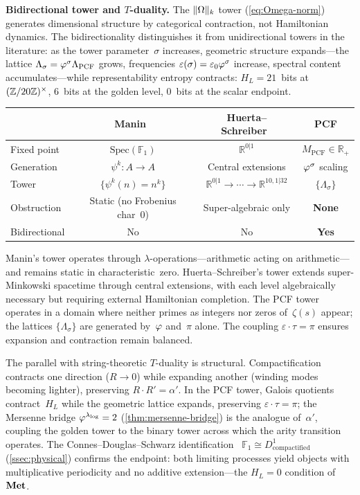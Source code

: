 \smallskip\noindent\textbf{Bidirectional tower and $T$-duality.}
The $\|\Omega\|_k$ tower (\cref{eq:Omega-norm}) generates
dimensional structure by categorical contraction, not Hamiltonian
dynamics.  The bidirectionality distinguishes it from unidirectional
towers in the literature: as the tower parameter~$\sigma$ increases,
geometric structure expands---the lattice
$\Lambda_\sigma = \varphi^\sigma\Lambda_{\mathrm{PCF}}$ grows,
frequencies $\varepsilon(\sigma)=\varepsilon_0\varphi^\sigma$ increase,
spectral content accumulates---while representability entropy contracts:
$H_L = 21$~bits at $(\mathbb{Z}/20\mathbb{Z})^\times$, $6$~bits at the golden level, $0$~bits
at the scalar endpoint.

\begin{center}
\small
\begin{tabular}{lccc}
\toprule
 & Manin~\cite{manin13} & Huerta--Schreiber~\cite{huerta2018m}
 & \textbf{PCF} \\
\midrule
Fixed point & $\mathrm{Spec}(\mathbb{F}_1)$ & $\mathbb{R}^{0|1}$ &
  $M_{\mathrm{PCF}} \in \mathbb{R}_+$ \\
Generation & $\psi^k: A \to A$ & Central extensions &
  $\varphi^\sigma$ scaling \\
Tower & $\{\psi^k(n)=n^k\}$ &
  $\mathbb{R}^{0|1}\!\to\!\cdots\!\to\!\mathbb{R}^{10,1|32}$
  & $\{\Lambda_\sigma\}$ \\
Obstruction & Static (no Frobenius char~0) &
  Super-algebraic only & \textbf{None} \\
Bidirectional & No & No & \textbf{Yes} \\
\bottomrule
\end{tabular}
\end{center}

Manin's tower operates through $\lambda$-operations---arithmetic acting
on arithmetic---and remains static in characteristic~zero.
Huerta--Schreiber's tower extends super-Minkowski spacetime through
central extensions, with each level algebraically necessary but requiring
external Hamiltonian completion.  The PCF tower operates in a domain
where neither primes as integers nor zeros of~$\zeta(s)$ appear; the
lattices $\{\Lambda_\sigma\}$ are generated by~$\varphi$ and~$\pi$
alone.  The coupling $\varepsilon\cdot\tau=\pi$ ensures expansion and
contraction remain balanced.

The parallel with string-theoretic $T$-duality is structural.
Compactification contracts one direction ($R\to 0$) while expanding
another (winding modes becoming lighter), preserving $R\cdot R'=\alpha'$.
In the PCF tower, Galois quotients contract~$H_L$ while the geometric
lattice expands, preserving $\varepsilon\cdot\tau=\pi$; the Mersenne
bridge $\varphi^{\lambda_{\log}}=2$
(\cref{thm:mersenne-bridge}) is the analogue of~$\alpha'$,
coupling the golden tower to the binary tower across which the arity
transition operates.  The Connes--Douglas--Schwarz identification~\cite{connes98}
$\mathbb{F}_1\cong D^1_{\text{compactified}}$
(\cref{ssec:physical}) confirms the endpoint: both limiting
processes yield objects with multiplicative periodicity and no additive
extension---the $H_L=0$ condition of~$\mathbf{Met}$.

